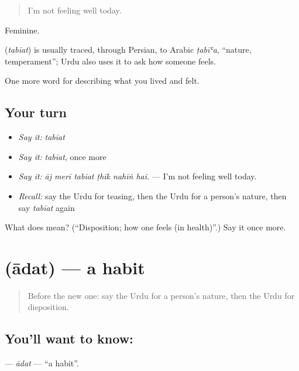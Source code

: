 \begin{quote}
I'm not feeling well today.
\end{quote}

Feminine.

\begin{cousinweb}
\textbf{} (\emph{tabīat}) is usually traced, through Persian, to Arabic \emph{ṭabīʿa}, \textquotedblleft{}nature, temperament\textquotedblright{}; Urdu also uses it to ask how someone feels.
\end{cousinweb}

\begin{grammarlens}[title={What you've built}]
One more word for describing what you lived and felt.
\end{grammarlens}

\subsection*{Your turn}
\begin{itemize}
\raggedright
  \item \emph{Say it:} \emph{tabīat}
  \item \emph{Say it:} \emph{tabīat}, once more
  \item \emph{Say it:} \emph{āj merī tabīat ṭhīk nahīṅ hai.} — I'm not feeling well today.
  \item \emph{Recall:} say the Urdu for teasing, then the Urdu for a person's nature, then say \emph{tabīat} again
\end{itemize}

\begin{tcolorbox}[breakable,colback=teal!4,colframe=teal!35!black,title={Before you move on}]
What does  mean? (\textquotedblleft{}Disposition; how one feels (in health)\textquotedblright{}.) Say it once more.
\end{tcolorbox}
\section[\texorpdfstring{\ur{عادت} (ādat)}{عادت (ādat)}]{ (ādat) — a habit}

\label{lesson:UR-C454-adat}



\begin{quote}
Before the new one: say the Urdu for a person's nature, then the Urdu for disposition.
\end{quote}

\subsection*{You'll want to know: }
\textbf{} — \emph{ādat} — \textquotedblleft{}a habit\textquotedblright{}.

